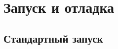 \documentclass[12pt, a4paper]{article}
\begin{document}

    \newpage
    \section{Запуск и отладка}

    \subsection{Стандартный запуск}
    
\end{document}
